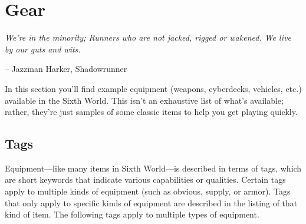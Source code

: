 \chapter{Gear} \label{Gear}

\epigraph{\textit{We're in the minority; Runners who are not jacked, rigged or wakened. We live by our guts and wits.}}{-- Jazzman Harker, Shadowrunner}

In this section you’ll find example equipment (weapons, cyberdecks, vehicles, etc.) available in the Sixth World. This isn’t an exhaustive list of what’s available; rather, they’re just samples of some classic items to help you get playing quickly.


\section{Tags}

Equipment—like many items in Sixth World—is described in terms of tags, which are short keywords that indicate various capabilities or qualities. Certain tags apply to multiple kinds of equipment (such as obvious, supply, or armor). Tags that only apply to specific kinds of equipment are described in the listing of that kind of item. The following tags apply to multiple types of equipment.


